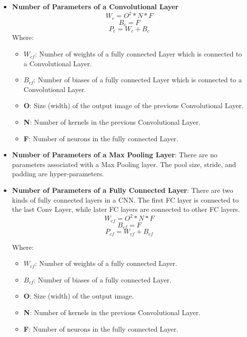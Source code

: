 \begin{itemize}
    \item \textbf{Number of Parameters of a Convolutional Layer}
    \begin{equation}
         W_{c} = O^{2} \ast N \ast F
    \end{equation}
\begin{equation}
     B_{c} = F
\end{equation}
\begin{equation}
     P_{c} = W_{c} + B_{c}
\end{equation}
Where:\\
\begin{itemize}
    \item \textbf{$W_{cf}$}: Number of weights of a fully connected Layer which is connected to a Convolutional Layer.
    \item \textbf{$B_{cf}$}: Number of biases of a fully connected Layer which is connected to a Convolutional Layer.
    \item \textbf{O}: Size (width) of the output image of the previous Convolutional Layer.
    \item \textbf{N}: Number of kernels in the previous Convolutional Layer.
    \item \textbf{F}: Number of neurons in the fully connected Layer.
    
\end{itemize}
    \item \textbf{Number of Parameters of a Max Pooling Layer}: There are no parameters associated with a Max Pooling layer. The pool size, stride, and padding are hyper-parameters.
    
    \item \textbf{Number of Parameters of a Fully Connected Layer}: There are two kinds of fully connected layers in a CNN. The first FC layer is connected to the last Conv Layer, while later FC layers are connected to other FC layers.
    \begin{equation}
 W_{cf} = O^{2} \ast N \ast F
\end{equation}
\begin{equation}
 B_{cf} = F
\end{equation}
\begin{equation}
 P_{cf} = W_{cf} + B_{cf}
\end{equation}

Where:\\
\begin{itemize}
    \item \textbf{$W_{cf}$}: Number of weights of a fully connected Layer.
    \item \textbf{$B_{cf}$}: Number of biases of a fully connected Layer.
    \item \textbf{O}: Size (width) of the output image.
    \item \textbf{N}: Number of kernels in the previous Convolutional Layer.
    \item \textbf{F}: Number of neurons in the fully connected Layer.
\end{itemize}
\end{itemize}
